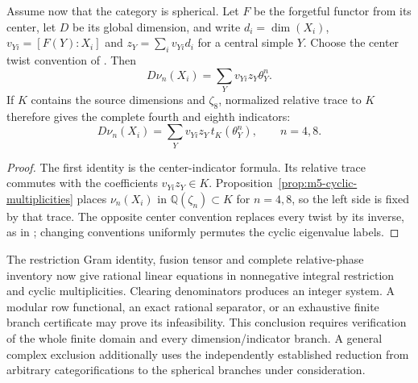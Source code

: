 \begin{proposition}
\label{prop:m5-cyclic-center-trace}
Assume now that the category is spherical. Let $F$ be the forgetful
functor from its center, let $D$ be its global dimension, and write
$d_i=\dim(X_i)$, $v_{Yi}=[F(Y):X_i]$ and
$z_Y=\sum_i v_{Yi}d_i$ for a central simple $Y$.
Choose the center twist convention of
\cite[Theorem~4.1]{NgSchauenburgExponent}.  Then
\[
 D\nu_n(X_i)=\sum_Yv_{Yi}z_Y\theta_Y^n.
\]
If $K$ contains the source dimensions and $\zeta_8$, normalized relative
trace to $K$ therefore gives the complete fourth and eighth indicators:
\[
 D\nu_n(X_i)=\sum_Yv_{Yi}z_Y\,t_K(\theta_Y^n),\qquad n=4,8.
\]
\end{proposition}
\begin{proof}
The first identity is the center-indicator formula. Its relative trace
commutes with the coefficients $v_{Yi}z_Y\in K$.
Proposition~\ref{prop:m5-cyclic-multiplicities} places $\nu_n(X_i)$
in $\mathbb Q(\zeta_n)\subset K$ for $n=4,8$, so the left side is
fixed by that trace. The opposite center convention replaces every twist
by its inverse, as in \cite[Remark~4.3]{NgSchauenburgExponent}; changing
conventions uniformly permutes the cyclic eigenvalue labels.
\end{proof}

The restriction Gram identity, fusion tensor and complete relative-phase
inventory now give rational linear equations in nonnegative integral
restriction and cyclic multiplicities. Clearing denominators produces an
integer system. A modular row functional, an exact rational separator,
or an exhaustive finite branch certificate may prove its infeasibility.
This conclusion requires verification of the whole finite domain and every
dimension/indicator branch. A general complex exclusion additionally uses
the independently established reduction from arbitrary categorifications
to the spherical branches under consideration.

